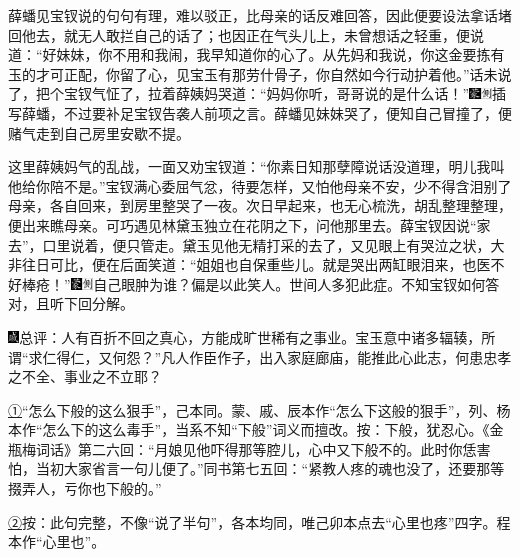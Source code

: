 薛蟠见宝钗说的句句有理，难以驳正，比母亲的话反难回答，因此便要设法拿话堵回他去，就无人敢拦自己的话了；也因正在气头儿上，未曾想话之轻重，便说道：``好妹妹，你不用和我闹，我早知道你的心了。从先妈和我说，你这金要拣有玉的才可正配，你留了心，见宝玉有那劳什骨子，你自然如今行动护着他。''话未说了，把个宝钗气怔了，拉着薛姨妈哭道：``妈妈你听，哥哥说的是什么话！''{\includegraphics[width=3mm]{../Images/00006}\includegraphics[width=3mm]{../Images/00011}\footnotesize \kaishu 插写薛蟠，不过要补足宝钗告袭人前项之言。}薛蟠见妹妹哭了，便知自己冒撞了，便赌气走到自己房里安歇不提。

这里薛姨妈气的乱战，一面又劝宝钗道：``你素日知那孽障说话没道理，明儿我叫他给你陪不是。''宝钗满心委屈气忿，待要怎样，又怕他母亲不安，少不得含泪别了母亲，各自回来，到房里整哭了一夜。次日早起来，也无心梳洗，胡乱整理整理，便出来瞧母亲。可巧遇见林黛玉独立在花阴之下，问他那里去。薛宝钗因说``家去''，口里说着，便只管走。黛玉见他无精打采的去了，又见眼上有哭泣之状，大非往日可比，便在后面笑道：``姐姐也自保重些儿。就是哭出两缸眼泪来，也医不好棒疮！''{\includegraphics[width=3mm]{../Images/00006}\includegraphics[width=3mm]{../Images/00011}\footnotesize \kaishu 自己眼肿为谁？偏是以此笑人。世间人多犯此症。}不知宝钗如何答对，且听下回分解。

{\includegraphics[width=3mm]{../Images/00005}总评：人有百折不回之真心，方能成旷世稀有之事业。宝玉意中诸多辐辏，所谓``求仁得仁，又何怨？''凡人作臣作子，出入家庭廊庙，能推此心此志，何患忠孝之不全、事业之不立耶？}

{\href{../Text/part0038_split_000.html\#navto_1_a}{①}``怎么下般的这么狠手''，己本同。蒙、戚、辰本作``怎么下这般的狠手''，列、杨本作``怎么下的这么毒手''，当系不知``下般''词义而擅改。按：下般，犹忍心。《金瓶梅词话》第二六回：``月娘见他吓得那等腔儿，心中又下般不的。此时你恁害怕，当初大家省言一句儿便了。''同书第七五回：``紧教人疼的魂也没了，还要那等掇弄人，亏你也下般的。''}

{\href{../Text/part0038_split_000.html\#navto_2_a}{②}按：此句完整，不像``说了半句''，各本均同，唯己卯本点去``心里也疼''四字。程本作``心里也''。}
